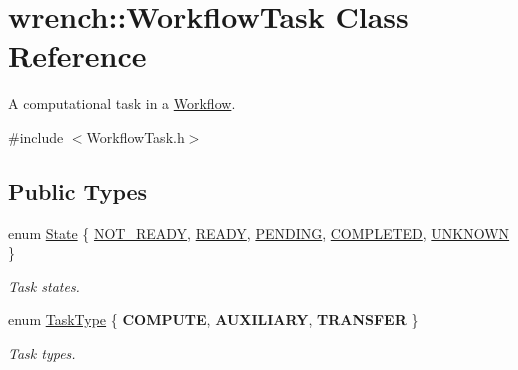 \hypertarget{classwrench_1_1_workflow_task}{}\section{wrench\+:\+:Workflow\+Task Class Reference}
\label{classwrench_1_1_workflow_task}


A computational task in a \hyperlink{classwrench_1_1_workflow}{Workflow}.  




{\ttfamily \#include $<$Workflow\+Task.\+h$>$}

\subsection*{Public Types}
\begin{DoxyCompactItemize}
\item 
enum \hyperlink{classwrench_1_1_workflow_task_a1184f3d7aea21e1c87a9b17e84f1f92a}{State} \{ \newline
\hyperlink{classwrench_1_1_workflow_task_a1184f3d7aea21e1c87a9b17e84f1f92aa2fbcca8f5a8c10675c9036c61826e6bc}{N\+O\+T\+\_\+\+R\+E\+A\+DY}, 
\hyperlink{classwrench_1_1_workflow_task_a1184f3d7aea21e1c87a9b17e84f1f92aae983a946ee97e094f18524d6b392d2f9}{R\+E\+A\+DY}, 
\hyperlink{classwrench_1_1_workflow_task_a1184f3d7aea21e1c87a9b17e84f1f92aaa5207e01401874a04d2ddae6191fd9af}{P\+E\+N\+D\+I\+NG}, 
\hyperlink{classwrench_1_1_workflow_task_a1184f3d7aea21e1c87a9b17e84f1f92aa5f1f15812ee2b25d3b4f5229b283fc5c}{C\+O\+M\+P\+L\+E\+T\+ED}, 
\newline
\hyperlink{classwrench_1_1_workflow_task_a1184f3d7aea21e1c87a9b17e84f1f92aa1229246389ad56793373ebd4384ee05d}{U\+N\+K\+N\+O\+WN}
 \}\begin{DoxyCompactList}\small\item\em Task states. \end{DoxyCompactList}
\item 
\mbox{\label{classwrench_1_1_workflow_task_a490a935259b9425a3e4fb011a86cb4bf}} 
enum \hyperlink{classwrench_1_1_workflow_task_a490a935259b9425a3e4fb011a86cb4bf}{Task\+Type} \{ {\bfseries C\+O\+M\+P\+U\+TE}, 
{\bfseries A\+U\+X\+I\+L\+I\+A\+RY}, 
{\bfseries T\+R\+A\+N\+S\+F\+ER}
 \}\begin{DoxyCompactList}\small\item\em Task types. \end{DoxyCompactList}
\end{DoxyCompactItemize}
